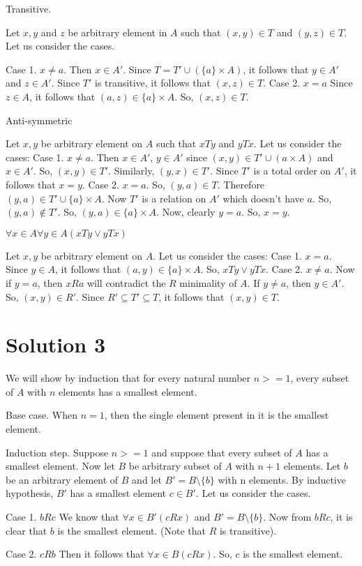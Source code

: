 \documentclass{article}
\begin{document}
Transitive.

Let $x,y$ and $z$ be arbitrary element in $A$ such that $(x,y) \in T$
and $(y,z) \in T$. Let us consider the cases.

Case 1. $x \neq a$. Then $x \in A'$. Since
$T = T' \cup (\{a\} \times A)$, it follows that $y \in A'$ and
$z \in A'$. Since $T'$ is transitive, it follows that $(x,z) \in T$.
Case 2. $x = a$ Since $z \in A$, it follows that
$(a,z) \in \{a\} \times A$. So, $(x,z) \in T$.

Anti-symmetric

Let $x,y$ be arbitrary element on $A$ such that $xTy$ and $yTx$. Let
us consider the cases:
Case 1. $x \neq a$. Then $x \in A'$, $y \in A'$ since $(x,y) \in T'
\cup ({a} \times A)$ and $x \in A'$. So, $(x,y) \in T'$. Similarly,
$(y,x) \in T'$. Since $T'$ is a total order on $A'$, it follows that
$x = y$.
Case 2. $x = a$. So, $(y,a) \in T$. Therefore $(y,a) \in T' \cup \{a\}
\times A$. Now $T'$ is a relation on $A'$ which doesn't have $a$. So,
$(y,a) \notin T'$. So, $(y,a) \in \{a\} \times A$. Now, clearly $y =
a$. So, $x = y$.

$\forall x \in A \forall y \in A (xTy \lor yTx)$

Let $x,y$ be arbitrary element on $A$. Let us consider the cases:
Case 1. $x = a$. Since $y \in A$, it follows that $(a,y) \in \{a\}
\times A$. So, $xTy \lor yTx$.
Case 2. $x \neq a$. Now if $y = a$, then $xRa$ will contradict the $R$
minimality of $A$. If $y \neq a$, then $y \in A'$. So, $(x,y) \in R'$.
Since $R' \subseteq T' \subseteq T$, it follows that $(x,y) \in T$.

\section{Solution 3}
We will show by induction that for every natural number $n >= 1$,
every subset of $A$ with $n$ elements has a smallest element.

Base case. When $n =1$, then the single element present in it is the
smallest element.

Induction step. Suppose $n >= 1$ and suppose that every subset of $A$
has a smallest element. Now let $B$ be arbitrary subset of $A$ with
$n+1$ elements. Let $b$ be an arbitrary element of $B$ and let
$B' = B \setminus \{b\}$ with n elements. By inductive hypothesis,
$B'$ has a smallest element $c \in B'$. Let us consider the cases.

Case 1. $bRc$ We know that $\forall x \in B'(cRx)$ and $B' = B
\setminus \{b\}$.
Now from $bRc$, it is clear that $b$ is the smallest element. (Note
that $R$ is transitive).

Case 2. $cRb$ Then it follows that $\forall x \in B(cRx)$. So, $c$ is
the smallest element.
\end{document}
